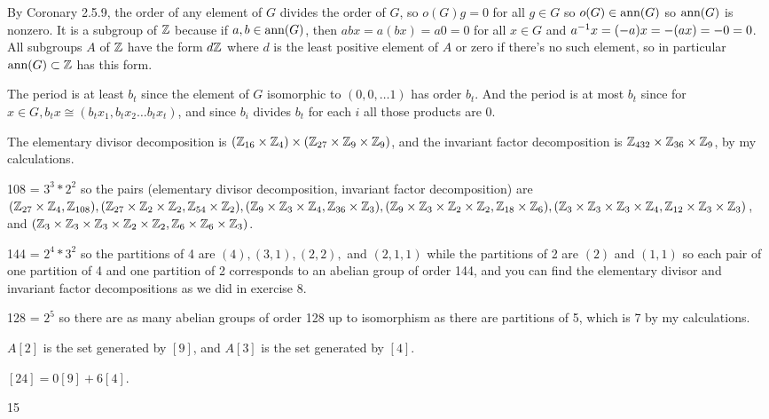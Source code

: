 \documentclass[11pt, oneside]{article}   	%
\begin{document}
\item By Coronary 2.5.9, the order of any element of $G$ divides the order of $G$, so $o(G)g = 0$ for all $g \in G$ so $o(G) \in \text{ann}(G)$ so $\text{ann}(G)$ is nonzero. It is a subgroup of $\mathbb{Z}$ because if $a, b \in \text{ann}(G)$, then $abx = a(bx) = a0 = 0$ for all $x \in G$ and $a^{-1} x = (-a)x = -(ax) = -0 = 0$. All subgroups $A$ of $\mathbb{Z}$ have the form $d\mathbb{Z}$ where $d$ is the least positive element of $A$ or zero if there's no such element, so in particular $\text{ann}(G) \subset \mathbb{Z}$ has this form.
\item The period is at least $b_t$ since the element of $G$ isomorphic to $(0, 0, \ldots 1)$ has order $b_t$. And the period is at most $b_t$ since for $x \in G, b_tx \cong (b_tx_1, b_tx_2 \ldots b_tx_t)$, and since $b_i$ divides $b_t$ for each $i$ all those products are 0.
\item The elementary divisor decomposition is $(\mathbb{Z}_{16} \times \mathbb{Z}_4) \times (\mathbb{Z}_{27} \times \mathbb{Z}_9 \times \mathbb{Z}_9)$, and the invariant factor decomposition is $\mathbb{Z}_{432} \times \mathbb{Z}_{36} \times \mathbb{Z}_9$, by my calculations.
\item 108 = $3^3 * 2^2$ so the pairs (elementary divisor decomposition, invariant factor decomposition) are $(\mathbb{Z}_{27} \times \mathbb{Z}_4, \mathbb{Z}_{108}), (\mathbb{Z}_{27} \times \mathbb{Z}_2 \times \mathbb{Z}_2, \mathbb{Z}_{54} \times \mathbb{Z}_2), (\mathbb{Z}_9 \times \mathbb{Z}_3 \times \mathbb{Z}_4, \mathbb{Z}_{36} \times \mathbb{Z}_3), (\mathbb{Z}_9 \times \mathbb{Z}_3 \times \mathbb{Z}_2 \times \mathbb{Z}_2, \mathbb{Z}_{18} \times \mathbb{Z}_6), (\mathbb{Z}_3 \times \mathbb{Z}_3 \times \mathbb{Z}_3 \times \mathbb{Z}_4, \mathbb{Z}_{12} \times \mathbb{Z}_3 \times \mathbb{Z}_3)$, and $(\mathbb{Z}_3 \times \mathbb{Z}_3 \times \mathbb{Z}_3 \times \mathbb{Z}_2 \times \mathbb{Z}_2, \mathbb{Z}_6 \times \mathbb{Z}_6 \times \mathbb{Z}_3)$.
\item 144 = $2^4 * 3^2$ so the partitions of 4 are $(4), (3, 1), (2, 2), $ and $(2, 1, 1)$ while the partitions of 2 are $(2)$ and $(1, 1)$ so each pair of one partition of 4 and one partition of 2 corresponds to an abelian group of order 144, and you can find the elementary divisor and invariant factor decompositions as we did in exercise 8.
\item 128 = $2^5$ so there are as many abelian groups of order 128 up to isomorphism as there are partitions of 5, which is 7 by my calculations.
\item \be
\item $A[2]$ is the set generated by $[9]$, and $A[3]$ is the set generated by $[4]$.
\item $[24] = 0[9] + 6[4]$.
\item 15
\end{document}

